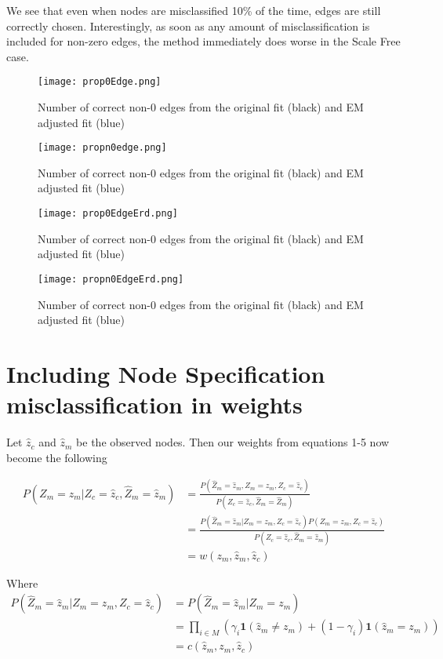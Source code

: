\documentclass[12pt]{article}
\begin{document}
We see that even when nodes are misclassified 10\% of the time, edges are still correctly chosen.  Interestingly, as soon as any amount of misclassification is included for non-zero edges, the method immediately does worse in the Scale Free case.  

\begin{figure}[h!]
\centering
\texttt{[image: prop0Edge.png]}
\caption{Number of correct non-0 edges from the original fit (black) and EM adjusted fit (blue)}
\end{figure}

\begin{figure}[h!]
\centering
\texttt{[image: propn0edge.png]}
\caption{Number of correct non-0 edges from the original fit (black) and EM adjusted fit (blue)}
\end{figure}

\begin{figure}[h!]
\centering
\texttt{[image: prop0EdgeErd.png]}
\caption{Number of correct non-0 edges from the original fit (black) and EM adjusted fit (blue)}
\end{figure}

\begin{figure}[h!]
\centering
\texttt{[image: propn0EdgeErd.png]}
\caption{Number of correct non-0 edges from the original fit (black) and EM adjusted fit (blue)}
\end{figure}
\clearpage

\section{Including Node Specification misclassification in weights}

Let $\hat{z}_c$ and $\hat{z}_m$ be the observed nodes.  Then our weights from equations 1-5 now become the following 

\begin{align}
P(Z_m=z_m | Z_c= \hat{z}_c, \hat{Z}_m = \hat{z}_m) &= \frac{P(\hat{Z}_m = \hat{z}_m, Z_m = z_m, Z_c = \hat{z}_c)}{P(Z_c = \hat{z}_c, \hat{Z}_m = \hat{Z}_m)}\\ 
&= \frac{P(\hat{Z}_m = \hat{z}_m|Z_m = z_m, Z_c = \hat{z}_c)P(Z_m = z_m, Z_c = \hat{z}_c)}{P(Z_c = \hat{z}_c, \hat{Z}_m = \hat{z}_m)} \\
&= w(z_m, \hat{z}_m, \hat{z}_c) 
\end{align}

Where 
\begin{align*}
P(\hat{Z}_m = \hat{z}_m|Z_m = z_m, Z_c = \hat{z}_c) &= P(\hat{Z}_m = \hat{z}_m|Z_m = z_m) \\
&= \prod_{i\in M}\left(\gamma_i\mathbf{1}(\hat{z}_m \neq z_m) + (1-\gamma_i)\mathbf{1}(\hat{z}_m = z_m)\right)\\
&=c(\hat{z}_m, z_m, \hat{z}_c)
\end{align*}
\end{document}

